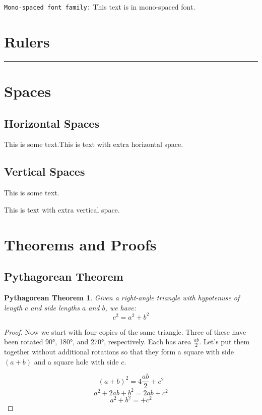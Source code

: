 \documentclass{article}
\begin{document}
\texttt{Mono-spaced font family:} This text is in mono-spaced font.

\section{Rulers}
\noindent\rule{\textwidth}{0.5pt}

\section{Spaces}
\subsection{Horizontal Spaces}
This is some text.\hspace{2cm}This is text with extra horizontal space.

\subsection{Vertical Spaces}
This is some text.

\vspace{1cm}

This is text with extra vertical space.

\section{Theorems and Proofs}
\subsection{Pythagorean Theorem}
\newtheorem{theorem}{Pythagorean Theorem}
\begin{theorem}
Given a right-angle triangle with hypotenuse of length $c$ and side lengths $a$ and $b$, we have:
    \begin{equation}
        c^2 = a^2 + b^2
    \end{equation}
\end{theorem}

\begin{proof}
Now we start with four copies of the same triangle. Three of these have been rotated 90°, 180°, and 270°, respectively. Each has area $\frac{ab}{2}$. Let's put them together without additional rotations so that they form a square with side $(a + b)$ and a square hole with side $c$.

\begin{equation}
    (a + b)^2 = 4 \frac{ab}{2} + c^2
\end{equation}
\begin{equation}
    a^2 + 2ab + b^2 = 2ab + c^2
\end{equation}
\begin{equation}
    a^2 + b^2 = + c^2
\end{equation}

\end{proof}
\end{document}
